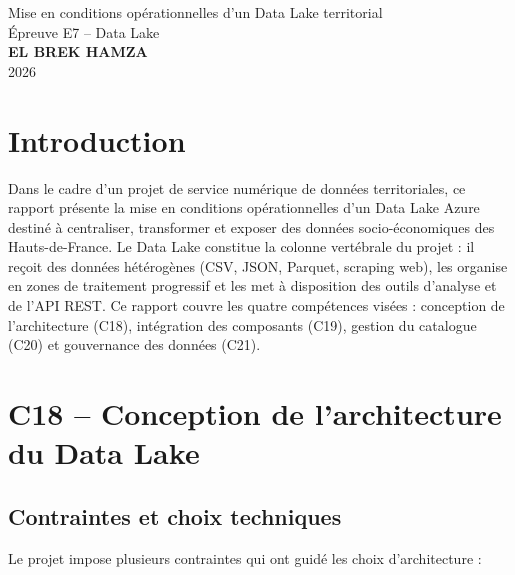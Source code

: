 \documentclass[12pt,a4paper]{article}
\begin{document}

\begin{center}
    \vspace*{1cm}
    {\Large Mise en conditions opérationnelles d'un Data Lake territorial}\\[0.4cm]
    {\large Épreuve E7 -- Data Lake}\\[1cm]
    {\large \textbf{EL BREK HAMZA}}\\[0.3cm]
    {\normalsize 2026}
\end{center}

\vspace{1cm}
\tableofcontents
\newpage

\section*{Introduction}

Dans le cadre d'un projet de service numérique de données territoriales, ce rapport présente la mise en conditions opérationnelles d'un Data Lake Azure destiné à centraliser, transformer et exposer des données socio-économiques des Hauts-de-France. Le Data Lake constitue la colonne vertébrale du projet : il reçoit des données hétérogènes (CSV, JSON, Parquet, scraping web), les organise en zones de traitement progressif et les met à disposition des outils d'analyse et de l'API REST. Ce rapport couvre les quatre compétences visées : conception de l'architecture (C18), intégration des composants (C19), gestion du catalogue (C20) et gouvernance des données (C21).

\newpage
\section{C18 -- Conception de l'architecture du Data Lake}

\subsection{Contraintes et choix techniques}

Le projet impose plusieurs contraintes qui ont guidé les choix d'architecture :
\end{document}
